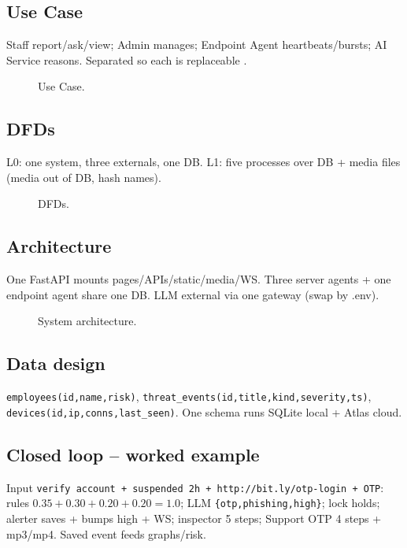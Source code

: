 \documentclass[11pt,a4paper]{article}
\begin{document}
\subsection{Use Case}
Staff report/ask/view; Admin manages; Endpoint Agent heartbeats/bursts; AI Service reasons. Separated so each is replaceable \cite{AutoGen24}.
\begin{figure}[h]\centering{}\caption{Use Case.}\end{figure}
\subsection{DFDs}
L0: one system, three externals, one DB. L1: five processes over DB + media files (media out of DB, hash names).
\begin{figure}[h]\centering{}\caption{DFDs.}\end{figure}
\subsection{Architecture}
One FastAPI mounts pages/APIs/static/media/WS. Three server agents + one endpoint agent share one DB. LLM external via one gateway (swap by .env).
\begin{figure}[h]\centering{}\caption{System architecture.}\end{figure}
\subsection{Data design}
\texttt{employees(id,name,risk)}, \texttt{threat\_events(id,title,kind,severity,ts)}, \texttt{devices(id,ip,conns,last\_seen)}. One schema runs SQLite local + Atlas cloud.
\subsection{Closed loop -- worked example}
Input \texttt{verify account + suspended 2h + http://bit.ly/otp-login + OTP}: rules $0.35+0.30+0.20+0.20=1.0$; LLM \texttt{\{otp,phishing,high\}}; lock holds; alerter saves + bumps high + WS; inspector 5 steps; Support OTP 4 steps + mp3/mp4. Saved event feeds graphs/risk.
\end{document}
